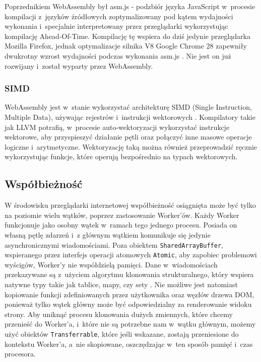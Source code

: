 Poprzednikiem WebAssembly był asm.js - podzbiór języka JavaScript w~procesie kompilacji z~języków źródłowych zoptymalizowany pod kątem wydajności wykonania i~specjalnie interpretowany przez przeglądarki wykorzystując kompilację Ahead-Of-Time. Kompilację tę wspiera do dziś jedynie przeglądarka Mozilla Firefox, jednak optymalizacje silnika V8 Google Chrome 28 zapewniły dwukrotny wzrost wydajności podczas wykonania asm.js \cite{asm.js-chrome}. Nie jest on już rozwijany i~został wyparty przez WebAssembly.

\subsubsection{SIMD}

WebAssembly jest w~stanie wykorzystać architekturę SIMD (Single Instruction, Multiple Data), używając rejestrów i~instrukcji wektorowych \cite{wasm-simd}. Kompilatory takie jak LLVM potrafią, w~procesie auto-wektoryzacji wykorzystać instrukcje wektorowe, aby przyspieszyć działanie pętli oraz połączyć inne masowe operacje logiczne i~arytmetyczne. Wektoryzację taką można również przeprowadzić ręcznie wykorzystując funkcje, które operują bezpośrednio na typach wektorowych.

\subsection{Współbieżność}

W środowisku przeglądarki internetowej współbieżność osiągnięta może być tylko na poziomie wielu wątków, poprzez zastosowanie Worker'ów. Każdy Worker funkcjonuje jako osobny wątek w~ramach tego jednego procesu. Posiada on własną pętlę zdarzeń i~z głównym wątkiem komunikuje się jedynie asynchronicznymi wiadomościami. Poza obiektem \lstinline{SharedArrayBuffer}, wspieranego przez interfejs operacji atomowych \lstinline{Atomic}, aby zapobiec problemowi wyścigów, Worker'y nie współdzielą pamięci. Dane w~wiadomościach przekazywane są z~użyciem algorytmu klonowania strukturalnego, który wspiera natywne typy takie jak tablice, mapy, czy sety \cite{structured-clone}. Nie możliwe jest natomiast kopiowanie funkcji zdefiniowanych przez użytkownika oraz węzłów drzewa DOM, ponieważ tylko wątek główny może być odpowiedzialny za renderowanie widoku strony. Aby uniknąć procesu klonowania dużych zmiennych, które chcemy przenieść do Worker'a, i~które nie są potrzebne nam w~wątku głównym, możemy użyć obiektów \lstinline{Transferrable}, które jeśli wskazane, zostają przeniesione do kontekstu Worker'a, a~nie skopiowane, oszczędzając w~ten sposób pamięć i~czas procesora.


